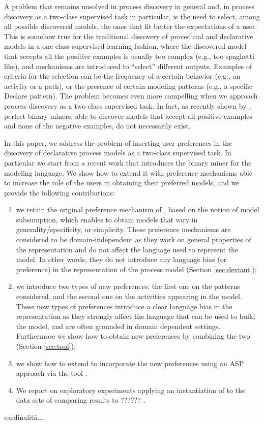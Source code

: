 A problem that remains unsolved in process discovery in general and, in process discovery as a two-class supervised task in particular, is the need to select, among all possible discovered models, the ones that fit better the expectations of a user. This is somehow true for the traditional discovery of procedural and declarative models in a one-class supervised learning fashion, where the discovered model that accepts all the positive examples is usually too complex (e.g., too spaghetti like), and mechanisms are introduced to ``select'' different outputs. Examples of criteria for the selection can be the frequency of a certain behavior (e.g., an activity or a path), or the presence of certain modeling patterns (e.g., a specific Declare pattern).   
The problem becomes even more compelling when we approach process discovery as a two-class supervised task. In fact, as recently shown by \cite{DBLP:conf/bpm/SlaatsDB21}, perfect binary miners, able to discover models that accept all positive examples and none of the negative examples, do not necessarily exist.  
 
In this paper, we address the problem of inserting user preferences in the discovery of declarative process models  as a two-class supervised task. In particular we start from a recent work \cite{deviant-arxiv} that introduces the \nd binary miner for the \declare \cite{2009-Aalst} modeling language. We show how to extend it with preference mechanisms able to increase the role of the users in obtaining their preferred models, and we provide the following contributions: 
\begin{enumerate}[{(i)}]
	\item we retain the original preference mechanism of \nd, based on the notion of model subsumption, which enables to obtain models that vary in generality/specificity, or simplicity. These preference mechanisms are considered to be domain-independent as they work on general properties of the representation and do not affect the language used to represent the model. In other words, they do not introduce any language bias (or preference) in the representation of the process model (Section \ref{sec:deviant});
	\item we introduce two types of new preferences: the first one on the \declare patterns considered, and the second one on the activities appearing in the model. These new types of preferences introduce a clear language bias in the representation as they strongly affect the language that can be used to build the model, and are often grounded in domain dependent settings. Furthermore we show how to obtain new preferences by combining the two (Section \ref{sec:tool}); 
	\item we show how to extend \nd to incorporate the new preferences using an \ac{ASP} \cite{2008-Lifschitz} approach via the \asprin tool \cite{DBLP:conf/aaai/BrewkaD0S15}.   
	\item We report on exploratory experiments applying an instantiation of \nd  to the data sets of \cite{DBLP:conf/bpm/SlaatsDB21} comparing results to ?????? .
\end{enumerate}


cardinalità...